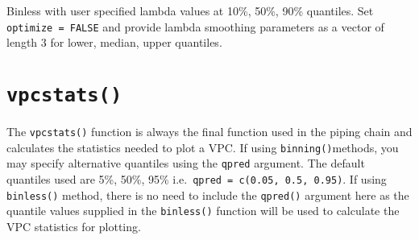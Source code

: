 \documentclass[
]{book}
\newenvironment{Shaded}{\begin{snugshade}}{\end{snugshade}}
\newcommand{\DataTypeTok}[1]{\textcolor[rgb]{0.13,0.29,0.53}{#1}}
\newcommand{\DecValTok}[1]{\textcolor[rgb]{0.00,0.00,0.81}{#1}}
\newcommand{\FloatTok}[1]{\textcolor[rgb]{0.00,0.00,0.81}{#1}}
\newcommand{\KeywordTok}[1]{\textcolor[rgb]{0.13,0.29,0.53}{\textbf{#1}}}
\newcommand{\NormalTok}[1]{#1}
\newcommand{\OperatorTok}[1]{\textcolor[rgb]{0.81,0.36,0.00}{\textbf{#1}}}
\newcommand{\OtherTok}[1]{\textcolor[rgb]{0.56,0.35,0.01}{#1}}
\newcommand{\StringTok}[1]{\textcolor[rgb]{0.31,0.60,0.02}{#1}}
\begin{document}
Binless with user specified lambda values at 10\%, 50\%, 90\% quantiles. Set \texttt{optimize\ =\ FALSE} and provide lambda smoothing parameters as a vector of length 3 for lower, median, upper quantiles.

\begin{Shaded}
\end{Shaded}

\hypertarget{vpcstats}{%
\section{\texorpdfstring{\texttt{vpcstats()}}{vpcstats()}}\label{vpcstats}}

The \texttt{vpcstats()} function is always the final function used in the piping chain and calculates the statistics needed to plot a VPC. If using \texttt{binning()}methods, you may specify alternative quantiles using the \texttt{qpred} argument. The default quantiles used are 5\%, 50\%, 95\% i.e.~\texttt{qpred\ =\ c(0.05,\ 0.5,\ 0.95)}. If using \texttt{binless()} method, there is no need to include the \texttt{qpred()} argument here as the quantile values supplied in the \texttt{binless()} function will be used to calculate the VPC statistics for plotting.

\begin{Shaded}
\end{Shaded}
\end{document}
